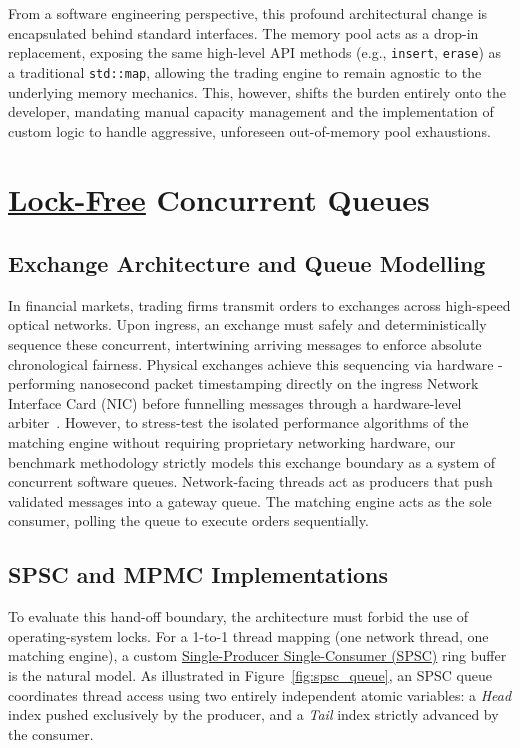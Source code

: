 From a software engineering perspective, this profound architectural change is 
encapsulated behind standard interfaces. The memory pool acts as a drop-in 
replacement, exposing the same high-level API methods (e.g., \texttt{insert}, 
\texttt{erase}) as a traditional \texttt{std::map}, allowing the trading 
engine to remain agnostic to the underlying memory mechanics. 
This, however, shifts the burden entirely onto the developer, mandating manual 
capacity management and the implementation of custom logic to handle aggressive, 
unforeseen out-of-memory pool exhaustions.

\vspace{1em}

\section{\hyperref[app:glossary]{Lock-Free} Concurrent Queues}

\subsection{Exchange Architecture and Queue Modelling}
In financial markets, trading firms transmit orders to exchanges 
across high-speed optical networks.
Upon ingress, an exchange must safely and deterministically sequence 
these concurrent, intertwining arriving messages to enforce 
absolute chronological fairness. 
Physical exchanges achieve this sequencing via hardware - performing 
nanosecond packet timestamping directly on the ingress Network 
Interface Card (NIC) before funnelling messages through a 
hardware-level arbiter~\citep{harrisequity}. 
However, to stress-test the isolated performance algorithms 
of the matching engine without requiring proprietary networking hardware, 
our benchmark methodology strictly models this exchange boundary 
as a system of concurrent software queues. 
Network-facing threads act as producers that push validated 
messages into a gateway queue.
The matching engine acts as the sole consumer, 
polling the queue to execute orders sequentially.



\subsection{SPSC and MPMC Implementations}
To evaluate this hand-off boundary, 
the architecture must forbid the use of operating-system locks. 
For a 1-to-1 thread mapping (one network thread, one matching engine), 
a custom \hyperref[app:glossary]{Single-Producer Single-Consumer (SPSC)} ring buffer 
is the natural model. 
As illustrated in Figure~\ref{fig:spsc_queue}, an SPSC queue coordinates 
thread access using two entirely independent atomic variables: 
a \textit{Head} index pushed exclusively by the producer, 
and a \textit{Tail} index strictly advanced by the consumer. 

